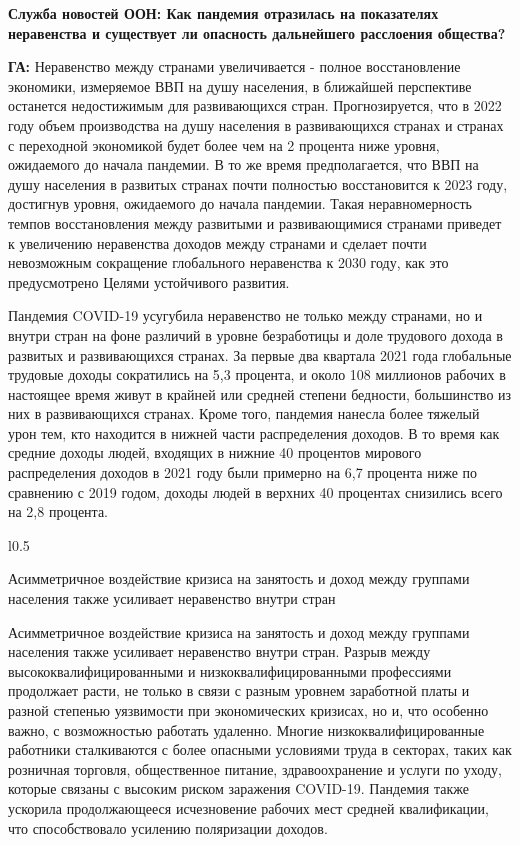 \textbf{Служба новостей ООН: Как пандемия отразилась на показателях неравенства и существует ли опасность дальнейшего расслоения общества? }

\textbf{ГА:} Неравенство между странами увеличивается - полное восстановление экономики, измеряемое ВВП на душу населения, в ближайшей перспективе останется недостижимым для развивающихся стран. Прогнозируется, что в 2022 году объем производства на душу населения в развивающихся странах и странах с переходной экономикой будет более чем на 2 процента ниже уровня, ожидаемого до начала пандемии.  В то же время предполагается, что ВВП на душу населения в развитых странах почти полностью восстановится к 2023 году, достигнув уровня, ожидаемого до начала пандемии. Такая неравномерность темпов восстановления между развитыми и развивающимися странами приведет к увеличению неравенства доходов между странами и сделает почти невозможным сокращение глобального неравенства к 2030 году, как это предусмотрено Целями устойчивого развития.

Пандемия COVID-19 усугубила неравенство не только между странами, но и внутри стран на фоне различий в уровне безработицы и доле трудового дохода в развитых и развивающихся странах. За первые два квартала 2021 года глобальные трудовые доходы сократились на 5,3 процента, и около 108 миллионов рабочих в настоящее время живут в крайней или средней степени бедности, большинство из них в развивающихся странах. Кроме того, пандемия нанесла более тяжелый урон тем, кто находится в нижней части распределения доходов. В то время как средние доходы людей, входящих в нижние 40 процентов мирового распределения доходов в 2021 году были примерно на 6,7 процента ниже по сравнению с 2019 годом, доходы людей в верхних 40 процентах снизились всего на 2,8 процента.

\begin{wrapfigure}{l}{0.5\textwidth}
    \begin{fancyquotes}
        Асимметричное воздействие кризиса на занятость и доход между группами населения также усиливает неравенство внутри стран
    \end{fancyquotes}
\end{wrapfigure}
Асимметричное воздействие кризиса на занятость и доход между группами населения также усиливает неравенство внутри стран. Разрыв между высококвалифицированными и низкоквалифицированными профессиями продолжает расти, не только в связи с разным уровнем заработной платы и разной степенью уязвимости при экономических кризисах, но и, что особенно важно, с возможностью работать удаленно. Многие низкоквалифицированные работники сталкиваются с более опасными условиями труда в секторах, таких как розничная торговля, общественное питание, здравоохранение и услуги по уходу, которые связаны с высоким риском заражения COVID-19. Пандемия также ускорила продолжающееся исчезновение рабочих мест средней квалификации, что способствовало усилению поляризации доходов.

